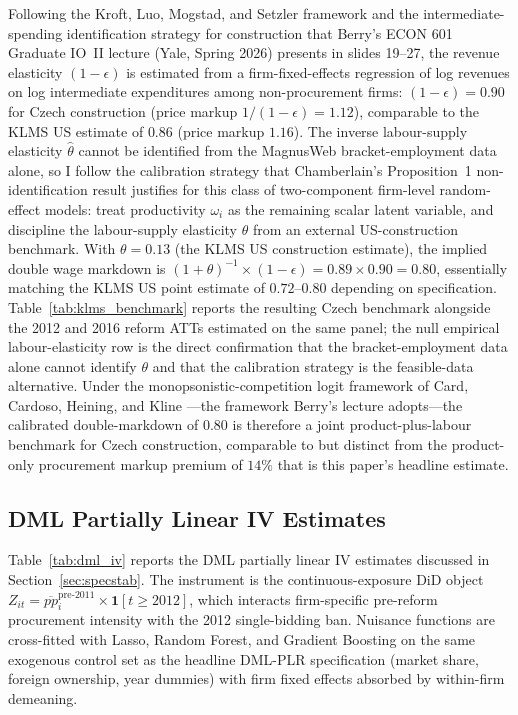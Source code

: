 \documentclass[11pt]{article}
\begin{document}
Following the Kroft, Luo, Mogstad, and Setzler \cite{KLMS2025} framework and the intermediate-spending identification strategy for construction that Berry's ECON 601 Graduate IO~II lecture (Yale, Spring 2026) presents in slides 19--27, the revenue elasticity $(1-\epsilon)$ is estimated from a firm-fixed-effects regression of log revenues on log intermediate expenditures among non-procurement firms: $(1-\epsilon) = 0.90$ for Czech construction (price markup $1/(1-\epsilon) = 1.12$), comparable to the KLMS US estimate of $0.86$ (price markup $1.16$). The inverse labour-supply elasticity $\hat\theta$ cannot be identified from the MagnusWeb bracket-employment data alone, so I follow the calibration strategy that Chamberlain's \cite{Chamberlain2022} Proposition~1 non-identification result justifies for this class of two-component firm-level random-effect models: treat productivity $\omega_i$ as the remaining scalar latent variable, and discipline the labour-supply elasticity $\theta$ from an external US-construction benchmark. With $\theta = 0.13$ (the KLMS US construction estimate), the implied double wage markdown is $(1+\theta)^{-1} \times (1-\epsilon) = 0.89 \times 0.90 = 0.80$, essentially matching the KLMS US point estimate of $0.72$--$0.80$ depending on specification. Table~\ref{tab:klms_benchmark} reports the resulting Czech benchmark alongside the 2012 and 2016 reform ATTs estimated on the same panel; the null empirical labour-elasticity row is the direct confirmation that the bracket-employment data alone cannot identify $\theta$ and that the calibration strategy is the feasible-data alternative. Under the monopsonistic-competition logit framework of Card, Cardoso, Heining, and Kline \cite{CCHK2018}---the framework Berry's lecture adopts---the calibrated double-markdown of $0.80$ is therefore a joint product-plus-labour benchmark for Czech construction, comparable to but distinct from the product-only procurement markup premium of $14\%$ that is this paper's headline estimate.




\subsection{DML Partially Linear IV Estimates}\label{app:dml_iv}

Table~\ref{tab:dml_iv} reports the DML partially linear IV estimates discussed in Section~\ref{sec:specstab}. The instrument is the continuous-exposure DiD object $Z_{it} = \overline{pp}_i^{\text{pre-2011}} \times \mathbf{1}[t \geq 2012]$, which interacts firm-specific pre-reform procurement intensity with the 2012 single-bidding ban. Nuisance functions are cross-fitted with Lasso, Random Forest, and Gradient Boosting on the same exogenous control set as the headline DML-PLR specification (market share, foreign ownership, year dummies) with firm fixed effects absorbed by within-firm demeaning.
\end{document}

